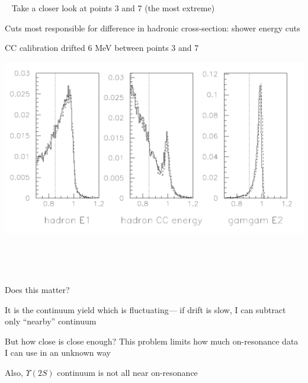 \documentclass[landscape]{article}
\newenvironment{slide}{\mbox{ }\vfill}{\vfill \mbox{ } \pagebreak}
\begin{document}
\begin{slide}
  Take a closer look at points 3 and 7 (the most extreme)

  \vfill Cuts most responsible for difference in hadronic
  cross-section: shower energy cuts

  \vfill CC calibration drifted 6 MeV between points 3 and 7

  \vfill
  \begin{center}
    \includegraphics[width=0.9\linewidth]{forptatalk.pdf}
  \end{center}
\end{slide}

\begin{slide}
  \vfill
  \begin{center}
    \begin{minipage}{0.85\linewidth} Does this matter? \end{minipage}

    \vfill \begin{minipage}{0.85\linewidth} It is the continuum
      yield which is fluctuating--- if drift is slow, I can subtract only
      ``nearby'' continuum \end{minipage}

    \vfill \begin{minipage}{0.85\linewidth} But how close is close
      enough?  This problem limits how much on-resonance data I can use in
      an unknown way \end{minipage}

    \vfill \begin{minipage}{0.85\linewidth} Also, $\Upsilon(2S)$
    continuum is not all near on-resonance \end{minipage}
  \end{center}
  \vfill
\end{slide}
\end{document}
